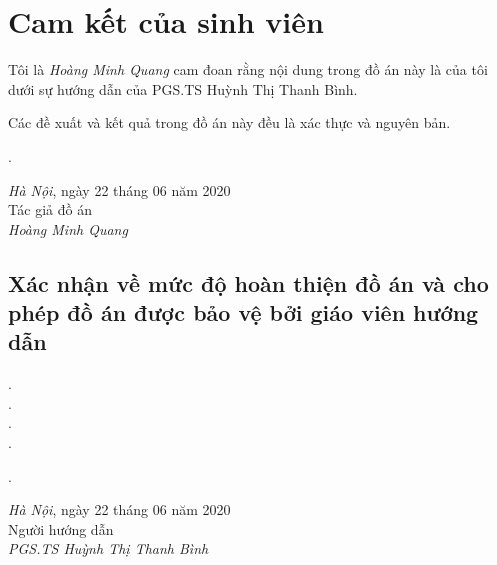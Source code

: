 \pagebreak

\section*{Cam kết của sinh viên}
Tôi là \textit{Hoàng Minh Quang} cam đoan rằng nội dung trong đồ án này là của tôi dưới sự hướng dẫn của PGS.TS Huỳnh Thị Thanh Bình.

Các đề xuất và kết quả trong đồ án này đều là xác thực và nguyên bản.\\
\begin{minipage}{0.5\textwidth}
.
\end{minipage}
\begin{minipage}[t]{0.5\textwidth}
\begin{center}
  \textit{Hà Nội}, ngày 22 tháng 06 năm 2020\\
  Tác giả đồ án\\[3cm]
  
  \textit{Hoàng Minh Quang}
\end{center}
\end{minipage}

\subsection*{Xác nhận về mức độ hoàn thiện đồ án và cho phép đồ án được bảo vệ bởi giáo viên hướng dẫn}
.\dotfill \\
.\dotfill \\ 
.\dotfill \\ 
.\dotfill \\
\begin{minipage}{0.5\textwidth}
 .
\end{minipage}
\begin{minipage}[t]{0.5\textwidth}

\begin{center}
  \textit{Hà Nội}, ngày 22 tháng 06 năm 2020\\
  Người hướng dẫn\\[3cm]
  
  \textit{PGS.TS Huỳnh Thị Thanh Bình}
\end{center}
\end{minipage}

\pagebreak
